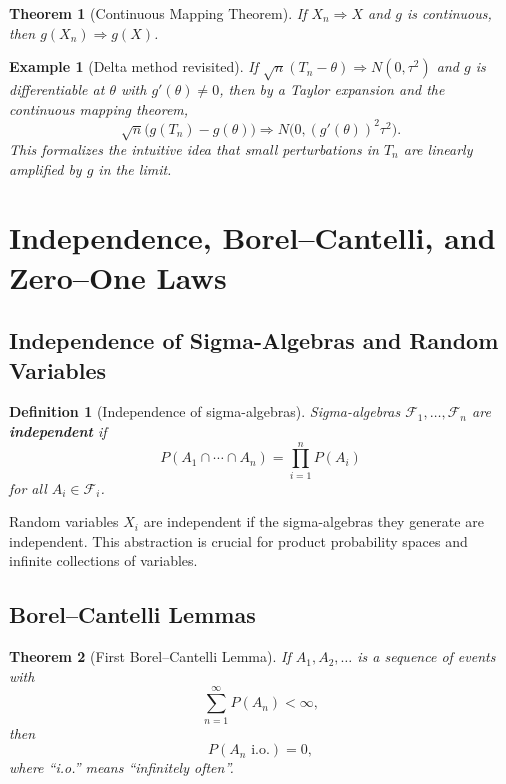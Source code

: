 \documentclass[11pt,a4paper]{article}
\newtheorem{definition}{Definition}[section]
\newtheorem{theorem}{Theorem}[section]
\newtheorem{example}{Example}[section]
\numberwithin{equation}{section}
\begin{document}
\begin{theorem}[Continuous Mapping Theorem]
If $X_n \Rightarrow X$ and $g$ is continuous, then $g(X_n) \Rightarrow g(X)$.
\end{theorem}

\begin{example}[Delta method revisited]
If $\sqrt{n}(T_n-\theta) \Rightarrow N(0,\tau^2)$ and $g$ is differentiable at $\theta$ with $g'(\theta)\ne 0$, then by a Taylor expansion and the continuous mapping theorem,
\[
\sqrt{n}\big(g(T_n)-g(\theta)\big) \Rightarrow N\big(0,(g'(\theta))^2\tau^2\big).
\]
This formalizes the intuitive idea that small perturbations in $T_n$ are linearly amplified by $g$ in the limit.

\end{example}

\newpage

\section{Independence, Borel--Cantelli, and Zero--One Laws}
\label{sec:independence-bc}

\subsection{Independence of Sigma-Algebras and Random Variables}

\begin{definition}[Independence of sigma-algebras]
Sigma-algebras $\mathcal{F}_1,\dots,\mathcal{F}_n$ are \textbf{independent} if
\[
P(A_1\cap\cdots\cap A_n) = \prod_{i=1}^n P(A_i)
\]
for all $A_i\in \mathcal{F}_i$.
\end{definition}

Random variables $X_i$ are independent if the sigma-algebras they generate are independent. 
This abstraction is crucial for product probability spaces and infinite collections of variables.

\subsection{Borel--Cantelli Lemmas}

\begin{theorem}[First Borel--Cantelli Lemma]
If $A_1,A_2,\dots$ is a sequence of events with
\[
\sum_{n=1}^\infty P(A_n) < \infty,
\]
then
\[
P(A_n \text{ i.o.}) = 0,
\]
where ``i.o.'' means ``infinitely often''.
\end{theorem}
\end{document}
